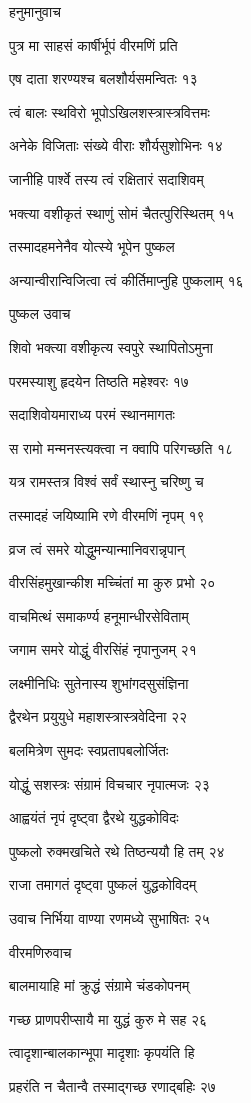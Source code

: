 हनुमानुवाच

पुत्र मा साहसं कार्षीर्भूपं वीरमणिं प्रति

एष दाता शरण्यश्च बलशौर्यसमन्वितः १३

त्वं बालः स्थविरो भूपोऽखिलशस्त्रास्त्रवित्तमः

अनेके विजिताः संख्ये वीराः शौर्यसुशोभिनः १४

जानीहि पार्श्वे तस्य त्वं रक्षितारं सदाशिवम्

भक्त्या वशीकृतं स्थाणुं सोमं चैतत्पुरिस्थितम् १५

तस्मादहमनेनैव योत्स्ये भूपेन पुष्कल

अन्यान्वीरान्विजित्वा त्वं कीर्तिमाप्नुहि पुष्कलाम् १६

पुष्कल उवाच

शिवो भक्त्या वशीकृत्य स्वपुरे स्थापितोऽमुना

परमस्याशु हृदयेन तिष्ठति महेश्वरः १७

सदाशिवोयमाराध्य परमं स्थानमागतः

स रामो मन्मनस्त्यक्त्वा न क्वापि परिगच्छति १८

यत्र रामस्तत्र विश्वं सर्वं स्थास्नु चरिष्णु च

तस्मादहं जयिष्यामि रणे वीरमणिं नृपम् १९

व्रज त्वं समरे योद्धुमन्यान्मानिवरान्नृपान्

वीरसिंहमुखान्कीश मच्चिंतां मा कुरु प्रभो २०

वाचमित्थं समाकर्ण्य हनूमान्धीरसेविताम्

जगाम समरे योद्धुं वीरसिंहं नृपानुजम् २१

लक्ष्मीनिधिः सुतेनास्य शुभांगदसुसंज्ञिना

द्वैरथेन प्रयुयुधे महाशस्त्रास्त्रवेदिना २२

बलमित्रेण सुमदः स्वप्रतापबलोर्जितः

योद्धुं सशस्त्रः संग्रामं विचचार नृपात्मजः २३

आह्वयंतं नृपं दृष्ट्वा द्वैरथे युद्धकोविदः

पुष्कलो रुक्मखचिते रथे तिष्ठन्ययौ हि तम् २४

राजा तमागतं दृष्ट्वा पुष्कलं युद्धकोविदम्

उवाच निर्भिया वाण्या रणमध्ये सुभाषितः २५

वीरमणिरुवाच

बालमायाहि मां क्रुद्धं संग्रामे चंडकोपनम्

गच्छ प्राणपरीप्सायै मा युद्धं कुरु मे सह २६

त्वादृशान्बालकान्भूपा मादृशाः कृपयंति हि

प्रहरंति न चैतान्वै तस्माद्गच्छ रणाद्बहिः २७

